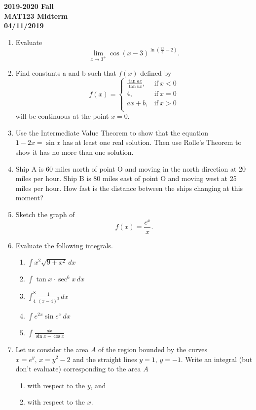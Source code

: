\documentclass[a4paper, 12pt]{article}
\begin{document}
\begin{center}
\textbf{2019-2020 Fall\\MAT123 Midterm\\04/11/2019}
\end{center}

\begin{enumerate}[leftmargin=*,label=\textbf{\arabic*.}]
\item Evaluate
\[\lim_{x\to3^+}\cos(x-3)^{\ln\left(\frac{2x}{3}-2\right)}.\]

\item Find constants a and b such that $f(x)$ defined by
\[
f(x) =
\begin{cases}
\displaystyle \frac{\tan ax}{\tan bx}, & \text{if}\ x < 0 \\[1em]
4, & \text{if}\ x = 0 \\[1em]
ax+b, & \text{if}\ x >0 \\
\end{cases}
\]
will be continuous at the point $x=0$.

\item Use the Intermediate Value Theorem to show that the equation $1-2x =\sin x$ has at least one real solution. Then use Rolle's Theorem to show it has no more than one solution.

\item Ship A is 60 miles north of point O and moving in the north direction at 20 miles per hour. Ship B is 80 miles east of point O and moving west at 25 miles per hour. How fast is the distance between the ships changing at this moment?

\item Sketch the graph of
\[f(x)=\frac{e^x}{x}.\]

\item Evaluate the following integrals.
\begin{enumerate}[leftmargin=*,label=\textbf{\alph*.}]
\item $\displaystyle\int x^2\sqrt{9+x^2}\,dx$
\item $\displaystyle\int\tan x\cdot\sec^6x\,dx$
\item $\displaystyle\int_4^8\frac{1}{(x-4)^3}\,dx$
\item $\displaystyle\int e^{2x}\sin e^x\,dx$
\item $\displaystyle\int\frac{dx}{\sin x-\cos x}$
\end{enumerate}

\item Let us consider the area $A$ of the region bounded by the curves $x= e^y,\,x=y^2-2$ and the straight lines $y=1,\,y=-1$. Write an integral (but don't evaluate) corresponding to the area $A$
\begin{enumerate}[leftmargin=*,label=\textbf{\roman*.}]
\item with respect to the $y$, and
\item with respect to the $x$.
\end{enumerate}
\end{enumerate}
\end{document}
